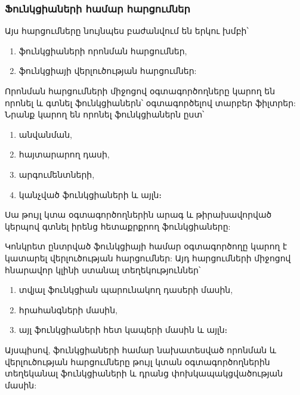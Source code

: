 \subsubsection*{Ֆունկցիաների համար հարցումներ}\label{subsubsec:functions}

Այս հարցումները նույնպես բաժանվում են երկու խմբի՝
\begin{enumerate}
    \item ֆունկցիաների որոնման հարցումներ,
    \item ֆունկցիայի վերլուծության հարցումներ:
\end{enumerate}
Որոնման հարցումների միջոցով օգտագործողները կարող են որոնել և գտնել ֆունկցիաներն՝ օգտագործելով տարբեր ֆիլտրեր:
Նրանք կարող են որոնել ֆունկցիաներն ըստ՝
\begin{enumerate}
    \item անվանման,
    \item հայտարարող դասի,
    \item արգումենտների,
    \item կանչված ֆունկցիաների և այլն։
\end{enumerate}

Սա թույլ կտա օգտագործողներին արագ և թիրախավորված կերպով գտնել իրենց հետաքրքրող ֆունկցիաները:

Կոնկրետ ընտրված ֆունկցիայի համար օգտագործողը կարող է կատարել վերլուծության հարցումներ: Այդ հարցումների միջոցով հնարավոր
կլինի ստանալ տեղեկություններ՝
\begin{enumerate}
    \item տվյալ ֆունկցիան պարունակող դասերի մասին,
    \item հրահանգների մասին,
    \item այլ ֆունկցիաների հետ կապերի մասին և այլն։
\end{enumerate}

Այսպիսով, ֆունկցիաների համար նախատեսված որոնման և վերլուծության հարցումները թույլ կտան օգտագործողներին տեղեկանալ ֆունկցիաների
և դրանց փոխկապակցվածության մասին:
